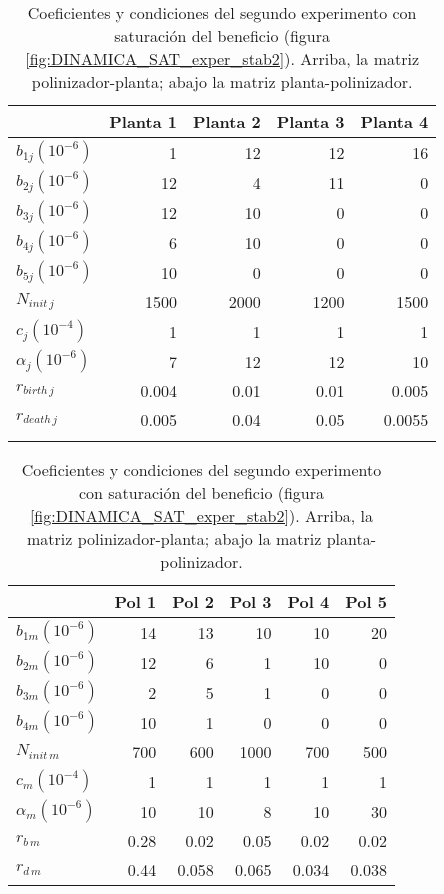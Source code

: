 \begin{table}[hp]
\centering
\caption{Coeficientes y condiciones del segundo experimento con saturación del beneficio (figura \ref{fig:DINAMICA_SAT_exper_stab2}). Arriba, la matriz polinizador-planta; abajo la matriz planta-polinizador.}

\footnotesize
\begin{tabular}{lrrrr}
\hline
 & Planta 1 & Planta 2 & Planta 3 & Planta 4  \\
\hline
$b_{1j}${\tiny $\left(10^{-6}\right)$} & 1 & 12 & 12 & 16\\
$b_{2j}${\tiny $\left(10^{-6}\right)$} & 12 & 4 & 11 & 0 \\
$b_{3j}${\tiny $\left(10^{-6}\right)$} & 12 & 10 & 0 & 0 \\
$b_{4j}${\tiny $\left(10^{-6}\right)$} & 6 & 10 & 0 & 0 \\
$b_{5j}${\tiny $\left(10^{-6}\right)$} & 10 & 0 & 0 & 0 \\
$N_{init\,j}$ & 1500 & 2000 & 1200 & 1500 \\
$c_{j}${\tiny $\left(10^{-4}\right)$} & 1 & 1 & 1 & 1 \\
$\alpha_{j}${\tiny $\left(10^{-6}\right)$} & 7 & 12 & 12 & 10 \\
$r_{birth\, j}$ & 0.004 & 0.01 & 0.01 & 0.005 \\
$r_{death\, j}$ & 0.005 & 0.04 & 0.05 & 0.0055 \\
\hline
\\
\end{tabular}
\centering
\begin{tabular}{lrrrrr}
\hline
 &Pol 1&Pol 2&Pol 3&Pol 4&Pol 5\\
\hline
$b_{1m}${\tiny $\left(10^{-6}\right)$}&14&13&10&10&20\\
$b_{2m}${\tiny $\left(10^{-6}\right)$}&12&6&1&10&0\\
$b_{3m}${\tiny $\left(10^{-6}\right)$}&2&5&1&0&0\\
$b_{4m}${\tiny $\left(10^{-6}\right)$}&10&1&0&0&0\\
$N_{init\,m}$ & 700 & 600 & 1000 & 700 & 500 \\
$c_{m}${\tiny $\left(10^{-4}\right)$} & 1 & 1 & 1 & 1 & 1\\
$\alpha_{m}${\tiny $\left(10^{-6}\right)$} & 10 & 10 & 8 & 10 & 30\\
$r_{b\, m}$ & 0.28 & 0.02 & 0.05 & 0.02 & 0.02 \\
$r_{d\, m}$ & 0.44 & 0.058 & 0.065 & 0.034 & 0.038 \\
\hline
\end{tabular}
\normalsize
\label{tab:SAT_experiment2}
\end{table}

